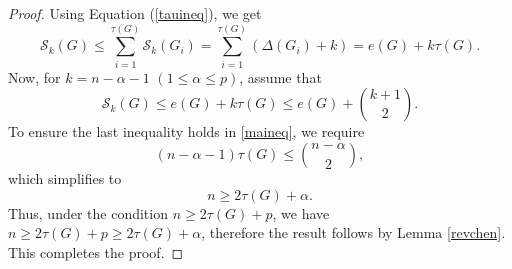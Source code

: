 \documentclass[12pt]{article}
\theoremstyle{plain}
\theoremstyle{definition}
\begin{document}
\begin{proof}  

Using Equation (\ref{tauineq}), we get
\begin{equation*}\label{xtauineq}
\mathcal{S}_k(G)\leq \sum_{i=1}^{\tau(G)}\mathcal{S}_k(G_i)=\sum_{i=1}^{\tau(G)} (\Delta(G_i) + k)=e(G)+k\tau(G).
\end{equation*} 
Now, for $k=n-\alpha-1 $ $(1\leq \alpha \leq p)$, assume that
\begin{equation}\label{maineq}
\mathcal{S}_k(G)\leq e(G)+k\tau(G) \leq e(G)+\binom{k+1}{2}.
\end{equation} 
To ensure the last inequality holds in \ref{maineq}, we require
$$(n-\alpha-1)\tau(G)\leq \binom{n-\alpha}{2},$$  
which simplifies to
$$n\geq 2\tau(G)+\alpha.$$  
Thus, under the condition $n\geq 2\tau(G)+p $, we have  $n\geq 2\tau(G)+p\geq 2\tau(G)+\alpha$,  therefore the result follows by Lemma \ref{revchen}. This completes the proof. 	  
\end{proof}
\end{document}
